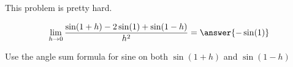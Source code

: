 \documentclass[handout]{ximera}
\begin{document}
\begin{exercise}
	\begin{warning}
		This problem is pretty hard.
	\end{warning}
	\[\lim_{h \to 0} \frac{\sin(1+h) - 2\sin(1)+\sin(1-h)}{h^2} = \answer{-\sin(1)}\]
	\begin{hint}
		Use the angle sum formula for sine on both $\sin(1+h)$ and $\sin(1-h)$
	\end{hint}
\end{exercise}
\end{document}
